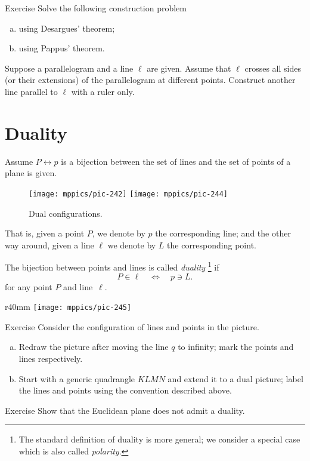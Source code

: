 \begin{thm}{Exercise}\label{ex:desargues-construction}
Solve the following construction problem
\begin{enumerate}[(a)]
\item\label{ex:desargues-construction:desargues} using Desargues' theorem;
\item\label{ex:desargues-construction:pappus} using Pappus' theorem.
\end{enumerate}
Suppose a parallelogram and a line $\ell$ are given.
Assume that $\ell$ crosses all sides (or their extensions) of the parallelogram at different points. 
Construct another line parallel to $\ell$ with a ruler only.
\end{thm}


\section{Duality}

Assume $P\leftrightarrow p$ is a bijection between the set of lines and the set of points of a plane is given.
\begin{figure}[!ht]
\centering
\texttt{[image: mppics/pic-242]}
\hskip15mm
\texttt{[image: mppics/pic-244]}
\caption*{Dual configurations.}
\end{figure}
That is,
given a point $P$, we denote by $p$ the corresponding line;
and the other way around, 
given a line $\ell$ we denote by $L$ the corresponding point. 

The bijection between points and lines is called \emph{duality}\label{page:duality}%
\footnote{The standard definition of duality is more general; we consider a special case which is also called \emph{polarity}.}
if 
\[P\in \ell
\quad
\iff
\quad 
p\ni L.\]
for any point $P$ and line~$\ell$.

{

\begin{wrapfigure}{r}{40mm}
\vskip-4mm
\centering
\texttt{[image: mppics/pic-245]}
\end{wrapfigure}

\begin{thm}{Exercise}\label{ex:dual-configurations}
Consider the configuration of lines and points in the picture.

\begin{enumerate}[(a)]
\item\label{ex:dual-configurations:infty} Redraw the picture after moving the line $q$ to infinity; mark the points and lines respectively.

\item\label{ex:dual-configurations:dual} Start with a generic quadrangle $KLMN$ and extend it to a dual picture; label the lines and points using the convention described above.
\end{enumerate}

\end{thm}

\begin{thm}{Exercise}\label{ex:dual-euclid}
Show that the Euclidean plane does not admit a duality. 
\end{thm}

}

